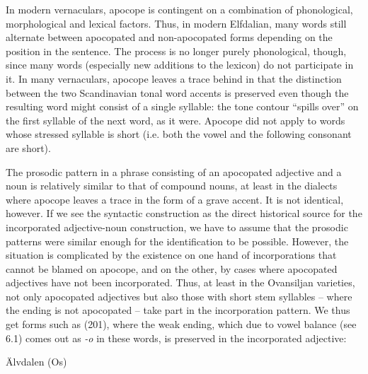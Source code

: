 In modern vernaculars, apocope is contingent on a combination of phonological, morphological and lexical factors. Thus, in modern Elfdalian, many words still alternate between apocopated and non-apocopated forms depending on the position in the sentence. The process is no longer purely phonological, though, since many words (especially new additions to the lexicon) do not participate in it. In many vernaculars, apocope leaves a trace behind in that the distinction between the two Scandinavian tonal word accents is preserved even though the resulting word might consist of a single syllable: the tone contour “spills over” on the first syllable of the next word, as it were. Apocope did not apply to words whose stressed syllable is short (i.e. both the vowel and the following consonant are short).


The prosodic pattern in a phrase consisting of an apocopated adjective and a noun is relatively similar to that of compound nouns, at least in the dialects where apocope leaves a trace in the form of a grave accent. It is not identical, however. If we see the syntactic construction as the direct historical source for the incorporated adjective-noun construction, we have to assume that the prosodic patterns were similar enough for the identification to be possible. However, the situation is complicated by the existence on one hand of incorporations that cannot be blamed on apocope, and on the other, by cases where apocopated adjectives have not been incorporated. Thus, at least in the Ovansiljan varieties, not only apocopated adjectives but also those with short stem syllables – where the ending is not apocopated – take part in the incorporation pattern. We thus get forms such as (201), where the weak ending, which due to vowel balance (see 6.1) comes out as\textit{ {}-o} in these words, is preserved in the incorporated adjective:


\item 

\label{bkm:Ref141171937}Älvdalen (Os)


